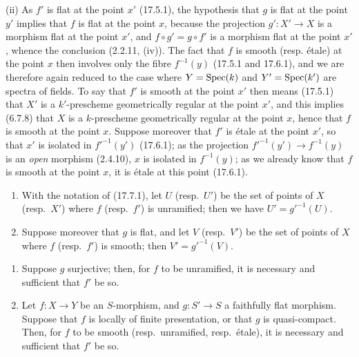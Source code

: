 (ii) As $f'$ is flat at the point $x'$ (17.5.1), the hypothesis that $g$ is flat at the point $y'$ implies that $f$ is flat at the point $x$, because the projection $g':X'\to X$ is a morphism flat at the point $x'$, and $f\circ g'=g\circ f'$ is a morphism flat at the point $x'$, whence the conclusion (2.2.11, (iv)). The fact that $f$ is smooth (resp. étale) at the point $x$ then involves only the fibre $f^{-1}(y)$ (17.5.1 and 17.6.1), and we are therefore again reduced to the case where $Y=\operatorname{Spec}(k)$ and $Y'=\operatorname{Spec}(k')$ are spectra of fields. To say that $f'$ is smooth at the point $x'$ then means (17.5.1) that $X'$ is a $k'$-prescheme geometrically regular at the point $x'$, and this implies (6.7.8) that $X$ is a $k$-prescheme geometrically regular at the point $x$, hence that $f$ is smooth at the point $x$. Suppose moreover that $f'$ is étale at the point $x'$, so that $x'$ is isolated in $f'^{-1}(y')$ (17.6.1); as the projection $f'^{-1}(y')\to f^{-1}(y)$ is an \emph{open} morphism (2.4.10), $x$ is isolated in $f^{-1}(y)$; as we already know that $f$ is smooth at the point $x$, it is étale at this point (17.6.1).

\begin{corollary}[17.7.2]
\label{IV.17.7.2}
\begin{enumerate}
  \item[\textup{(i)}] With the notation of \textup{(17.7.1)}, let $U$ \textup{(resp.}\ $U'$\textup{)} be the set of points of $X$ \textup{(resp.}\ $X'$\textup{)} where $f$ \textup{(resp.}\ $f'$\textup{)} is unramified; then we have $U'=g'^{-1}(U)$.
  \item[\textup{(ii)}] Suppose moreover that $g$ is flat, and let $V$ \textup{(resp.}\ $V'$\textup{)} be the set of points of $X$ where $f$ \textup{(resp.}\ $f'$\textup{)} is smooth; then $V'=g'^{-1}(V)$.
\end{enumerate}
\end{corollary}

\begin{corollary}[17.7.3]
\label{IV.17.7.3}
\begin{enumerate}
  \item[\textup{(i)}] Suppose $g$ surjective; then, for $f$ to be unramified, it is necessary and sufficient that $f'$ be so.
  \item[\textup{(ii)}] Let $f:X\to Y$ be an $S$-morphism, and $g:S'\to S$ a faithfully flat morphism. Suppose that $f$ is locally of finite presentation, \textup{or} that $g$ is quasi-compact. Then, for $f$ to be smooth \textup{(resp.}\ unramified, \textup{resp.}\ étale\textup{)}, it is necessary and sufficient that $f'$ be so.
\end{enumerate}
\end{corollary}

